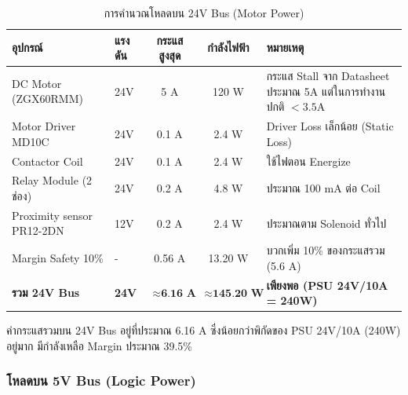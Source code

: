 \begin{table}[H]
    \centering
    \caption{การคำนวณโหลดบน 24V Bus (Motor Power)}
    \label{tab:load_24v}
    \begin{tabular}{llcc p{5cm}}
        \toprule
        \textbf{อุปกรณ์} & \textbf{แรงดัน} & \textbf{กระแสสูงสุด} & \textbf{กำลังไฟฟ้า} & \textbf{หมายเหตุ} \\
        \midrule
        DC Motor (ZGX60RMM) & 24V & 5 A & 120 W & กระแส Stall จาก Datasheet ประมาณ 5A แต่ในการทำงานปกติ $< 3.5$A \\
        Motor Driver MD10C & 24V & 0.1 A & 2.4 W & Driver Loss เล็กน้อย (Static Loss) \\
        Contactor Coil & 24V & 0.1 A & 2.4 W & ใช้ไฟตอน Energize \\
        Relay Module (2 ช่อง) & 24V & 0.2 A & 4.8 W & ประมาณ 100 mA ต่อ Coil \\
        Proximity sensor PR12-2DN  & 12V & 0.2 A & 2.4 W & ประมาณตาม Solenoid ทั่วไป \\
        Margin Safety 10\% & - & 0.56 A & 13.20 W & บวกเพิ่ม 10\% ของกระแสรวม (5.6 A) \\
        \midrule
        \textbf{รวม 24V Bus} & \textbf{24V} & $\approx\textbf{6.16 A}$ & $\approx\textbf{145.20 W}$ & \textbf{เพียงพอ (PSU 24V/10A = 240W)} \\
        \bottomrule
    \end{tabular}
\end{table}

ค่ากระแสรวมบน 24V Bus อยู่ที่ประมาณ 6.16 A ซึ่งน้อยกว่าพิกัดของ PSU 24V/10A (240W) อยู่มาก มีกำลังเหลือ Margin ประมาณ 39.5\%

\subsubsection{โหลดบน 5V Bus (Logic Power)}
\label{subsubsec:load_5v_bus}

